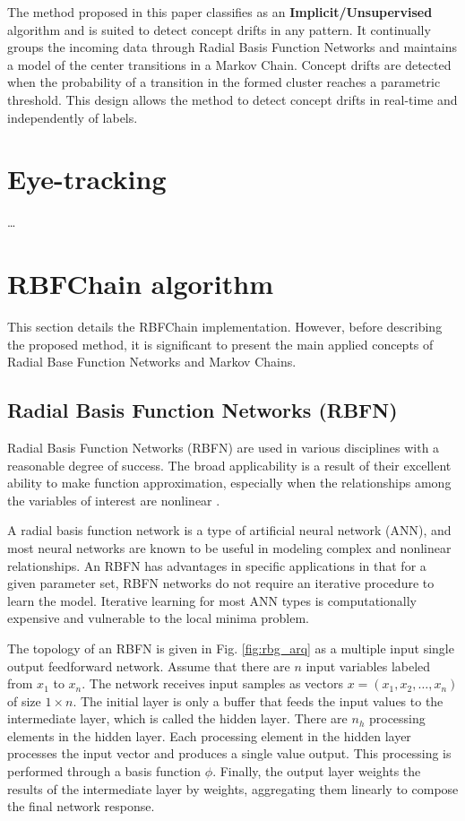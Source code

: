 \documentclass[preprint,12pt]{elsarticle}
\begin{document}
The method proposed in this paper classifies as an \textbf{Implicit/Unsupervised} algorithm and is suited to detect concept drifts in any pattern.
It continually groups the incoming data through Radial Basis Function Networks and maintains a model of the center transitions in a Markov Chain.
Concept drifts are detected when the probability of a transition in the formed cluster reaches a parametric threshold.
This design allows the method to detect concept drifts in real-time and independently of labels.

\section{Eye-tracking}
\label{sec:eye_tracking}

\ldots

\section{RBFChain algorithm}
\label{sec:rbfchain_algorithm}

This section details the RBFChain implementation. However, before describing the proposed method, it is significant to present the main applied concepts of Radial Base Function Networks and Markov Chains.

\subsection{Radial Basis Function Networks (RBFN)}

Radial Basis Function Networks (RBFN) are used in various disciplines with a reasonable degree of success. The broad applicability is a result of their excellent ability to make function approximation, especially when the relationships among the variables of interest are nonlinear \cite{Bishop:2006:PRM:1162264}.

A radial basis function network is a type of artificial neural network (ANN), and most neural networks are known to be useful in modeling complex and nonlinear relationships. An RBFN has advantages in specific applications in that for a given parameter set, RBFN networks do not require an iterative procedure to learn the model. Iterative learning for most ANN types is computationally expensive and vulnerable to the local minima problem.

The topology of an RBFN is given in Fig. \ref{fig:rbg_arq} as a multiple input single output feedforward network.
Assume that there are $n$ input variables labeled from $x_1$ to $x_n$.
The network receives input samples as vectors $x=(x_1, x_2, \ldots, x_n)$ of size $1 \times n$.
The initial layer is only a buffer that feeds the input values to the intermediate layer, which is called the hidden layer.
There are $n_h$ processing elements in the hidden layer.
Each processing element in the hidden layer processes the input vector and produces a single value output. This processing is performed through a basis function $\phi$.
Finally, the output layer weights the results of the intermediate layer by weights, aggregating them linearly to compose the final network response.
\end{document}
